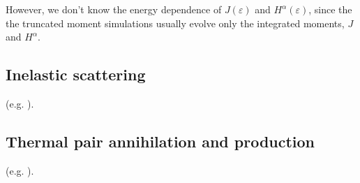 \documentclass[aps,prd,twocolumn,superscriptaddress]{revtex4-1}
\begin{document}
However, we don't know the energy dependence of $J(\varepsilon)$ and
$H^\alpha(\varepsilon)$,
since the the truncated moment simulations usually evolve only the integrated
moments, $J$ and $H^\alpha$.

\subsection{Inelastic scattering}
\label{ssec:sources_si}
(e.g. \cite[Eqn.~A6]{brue1985-core_collapse}).

\subsection{Thermal pair annihilation and production}
\label{ssec:sources_pp}
(e.g. \cite[Eqn.~A9]{brue1985-core_collapse}).


\end{document}
